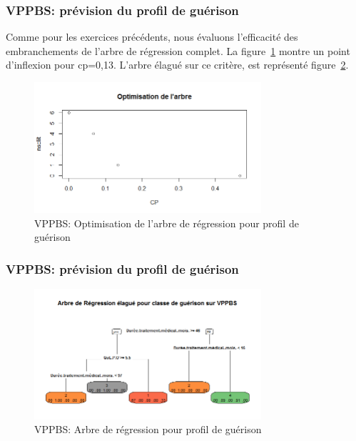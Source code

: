 %
%

%

\subsubsection{VPPBS: prévision du profil de guérison}

Comme pour les exercices précédents, nous évaluons l'efficacité des embranchements de l'arbre de régression complet. La figure~\ref{fig-vppbs-regtree-optim-healing-class} montre un point d'inflexion pour cp=0,13. L'arbre élagué sur ce critère, est représenté figure~\ref{fig-vppbs-regtree-ipss12}.

\begin{figure}[H]
\centering
\includegraphics[width=0.75\textwidth]{../Fig/VPPBS/vppbs-regtree-optim-healing-class.png}
\caption{VPPBS: Optimisation de l'arbre de régression pour profil de guérison}
\label{fig-vppbs-regtree-optim-healing-class}
\end{figure}

\subsubsection{VPPBS: prévision du profil de guérison}
\begin{figure}[H]
\centering
\includegraphics[width=0.75\textwidth]{../Fig/VPPBS/vppbs-regtree-healing-class.png}
\caption{VPPBS: Arbre de régression pour profil de guérison}
\label{fig-vppbs-regtree-ipss12}
\end{figure}

